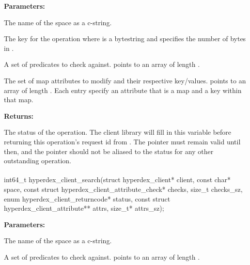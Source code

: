\noindent\textbf{Parameters:}
\begin{description}[labelindent=\widthof{{\code{mapattrs}, \code{mapattrs\_sz}}},leftmargin=*,noitemsep,nolistsep,align=right]
\item[\code{space}] The name of the space as a c-string.
\item[\code{key}, \code{key\_sz}] The key for the operation where  is a bytestring and  specifies the number of bytes in .
\item[\code{checks}, \code{checks\_sz}] A set of predicates to check against.   points to an array of length .
\item[\code{mapattrs}, \code{mapattrs\_sz}] The set of map attributes to modify and their respective key/values.   points to an array of length .  Each entry specify an attribute that is a map and a key within that map.
\end{description}

\noindent\textbf{Returns:}
\begin{description}[labelindent=\widthof{{\code{status}}},leftmargin=*,noitemsep,nolistsep,align=right]
\item[\code{status}] The status of the operation.  The client library will fill in this variable before returning this operation's request id from .  The pointer must remain valid until then, and the pointer should not be aliased to the status for any other outstanding operation.
\end{description}

\paragraph{}
\begin{ccode}
int64_t hyperdex_client_search(struct hyperdex_client* client,
                const char* space,
                const struct hyperdex_client_attribute_check* checks, size_t checks_sz,
                enum hyperdex_client_returncode* status,
                const struct hyperdex_client_attribute** attrs, size_t* attrs_sz);
\end{ccode}
\funcdesc 

\noindent\textbf{Parameters:}
\begin{description}[labelindent=\widthof{{\code{checks}, \code{checks\_sz}}},leftmargin=*,noitemsep,nolistsep,align=right]
\item[\code{space}] The name of the space as a c-string.
\item[\code{checks}, \code{checks\_sz}] A set of predicates to check against.   points to an array of length .
\end{description}


